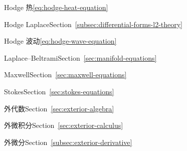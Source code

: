 \par\noindent\hspace*{1em}\label{index:equation-hodge-heat}{Hodge 热}\quad \eqref{eq:hodge-heat-equation}

\par\noindent\hspace*{1em}\label{index:equation-hodge-laplace}{Hodge Laplace}\quad Section~\ref{subsec:differential-forms-l2-theory}

\par\noindent\hspace*{1em}\label{index:equation-hodge-wave}{Hodge 波动}\quad \eqref{eq:hodge-wave-equation}

\par\noindent\hspace*{1em}\label{index:equation-laplace-beltrami}{Laplace–Beltrami}\quad Section~\ref{sec:manifold-equations}

\par\noindent\hspace*{1em}\label{index:equation-maxwell-s}{Maxwell}\quad Section~\ref{sec:maxwell-equations}

\par\noindent\hspace*{1em}\label{index:equation-stokes}{Stokes}\quad Section~\ref{sec:stokes-equations}

\par\noindent\hspace*{0em}\label{index:exterior-algebra}{外代数}\quad Section~\ref{sec:exterior-algebra}

\par\noindent\hspace*{0em}\label{index:exterior-calculus}{外微积分}\quad Section~\ref{sec:exterior-calculus}

\par\noindent\hspace*{0em}\label{index:exterior-derivative}{外微分}\quad Section~\ref{subsec:exterior-derivative}

